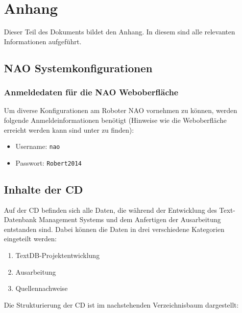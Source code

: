 \section{Anhang}
\label{anhangmin:Anhang}

Dieser Teil des Dokuments bildet den Anhang. In diesem sind alle relevanten Informationen aufgeführt. 

\secttoc

\subsection{NAO Systemkonfigurationen}
\label{anhangmin:NAOSyskonfig}

\subsubsection{Anmeldedaten für die NAO Weboberfläche}

Um diverse Konfigurationen am Roboter NAO vornehmen zu können, werden folgende Anmeldeinformationen benötigt (Hinweise wie die Weboberfläche erreicht werden kann sind unter \cite{NAO-startup} zu finden):
\begin{itemize}
	\item Username: \texttt{nao}
	\item	Passwort: \texttt{Robert2014}
\end{itemize} 

\subsection{Inhalte der CD}

Auf der CD befinden sich alle Daten, die während der Entwicklung des Text-Datenbank Management Systems und dem Anfertigen der Ausarbeitung entstanden sind. Dabei können die Daten in drei verschiedene Kategorien eingeteilt werden:
\begin{enumerate}
	\item TextDB-Projektentwicklung
	\item Ausarbeitung 
	\item Quellennachweise
\end{enumerate}

Die Strukturierung der CD ist im nachstehenden Verzeichnisbaum dargestellt:

\begin{figure}[h!]
	\centering
\end{figure}

